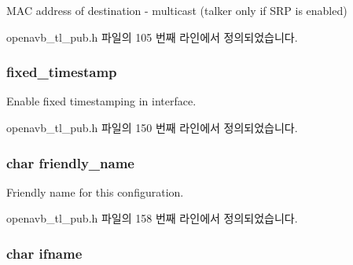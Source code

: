 M\+AC address of destination -\/ multicast (talker only if S\+RP is enabled) 



openavb\+\_\+tl\+\_\+pub.\+h 파일의 105 번째 라인에서 정의되었습니다.

\subsubsection[{\texorpdfstring{fixed\+\_\+timestamp}{fixed_timestamp}}]{ fixed\+\_\+timestamp}\hypertarget{structopenavb__tl__cfg__t_a441ba8abc0d757aaefdb2680e09f19ac}{}\label{structopenavb__tl__cfg__t_a441ba8abc0d757aaefdb2680e09f19ac}


Enable fixed timestamping in interface. 



openavb\+\_\+tl\+\_\+pub.\+h 파일의 150 번째 라인에서 정의되었습니다.

\subsubsection[{\texorpdfstring{friendly\+\_\+name}{friendly_name}}]{\setlength{\rightskip}{0pt plus 5cm}char friendly\+\_\+name}\hypertarget{structopenavb__tl__cfg__t_a0cd8a3733a3e1a077982c80482e5aeb5}{}\label{structopenavb__tl__cfg__t_a0cd8a3733a3e1a077982c80482e5aeb5}


Friendly name for this configuration. 



openavb\+\_\+tl\+\_\+pub.\+h 파일의 158 번째 라인에서 정의되었습니다.

\subsubsection[{\texorpdfstring{ifname}{ifname}}]{\setlength{\rightskip}{0pt plus 5cm}char ifname}\hypertarget{structopenavb__tl__cfg__t_a6a7c2523839aee5440af6ea2c11d8c02}{}\label{structopenavb__tl__cfg__t_a6a7c2523839aee5440af6ea2c11d8c02}


